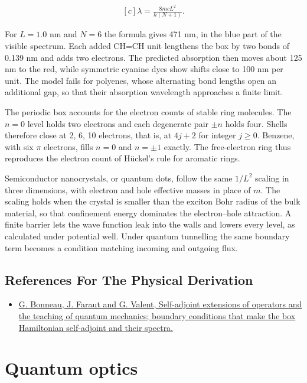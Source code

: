 \documentclass[11pt,oneside]{book}
\newenvironment{centeredalign}{\[\begin{gathered}[c]}{\end{gathered}\]}
\begin{document}
\begin{centeredalign}
\lambda=\frac{8mcL^2}{h(N+1)}.
\end{centeredalign}

For \(L=1.0\) nm and \(N=6\) the formula gives 471 nm, in the blue part of the visible spectrum. Each added CH=CH unit lengthens the box by two bonds of 0.139 nm and adds two electrons. The predicted absorption then moves about 125 nm to the red, while symmetric cyanine dyes show shifts close to 100 nm per unit. The model fails for polyenes, whose alternating bond lengths open an additional gap, so that their absorption wavelength approaches a finite limit.

The periodic box accounts for the electron counts of stable ring molecules. The \(n=0\) level holds two electrons and each degenerate pair \(\pm n\) holds four. Shells therefore close at 2, 6, 10 electrons, that is, at \(4j+2\) for integer \(j\geq0\). Benzene, with six \(\pi\) electrons, fills \(n=0\) and \(n=\pm1\) exactly. The free-electron ring thus reproduces the electron count of Hückel's rule for aromatic rings.

Semiconductor nanocrystals, or quantum dots, follow the same \(1/L^2\) scaling in three dimensions, with electron and hole effective masses in place of \(m\). The scaling holds when the crystal is smaller than the exciton Bohr radius of the bulk material, so that confinement energy dominates the electron--hole attraction. A finite barrier lets the wave function leak into the walls and lowers every level, as calculated under potential well. Under quantum tunnelling the same boundary term becomes a condition matching incoming and outgoing flux.

\subsection*{References For The Physical Derivation}
\begin{itemize}
\item \href{https://arxiv.org/abs/quant-ph/0103153}{G. Bonneau, J. Faraut and G. Valent, Self-adjoint extensions of operators and the teaching of quantum mechanics; boundary conditions that make the box Hamiltonian self-adjoint and their spectra.}
\end{itemize}





\clearpage

\section{Quantum optics}
\end{document}

